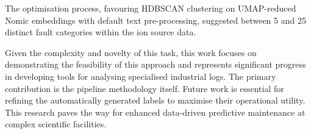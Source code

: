 \documentclass[10pt,oneside]{report}
\begin{document}
%

The optimisation process, favouring HDBSCAN clustering on UMAP-reduced Nomic embeddings with default text pre-processing, suggested between 5 and 25 distinct fault categories within the ion source data.

Given the complexity and novelty of this task, this work focuses on demonstrating the feasibility of this approach and represents significant progress in developing tools for analysing specialised industrial logs. The primary contribution is the pipeline methodology itself. Future work is essential for refining the automatically generated labels to maximise their operational utility. This research paves the way for enhanced data-driven predictive maintenance at complex scientific facilities.
\end{document}
